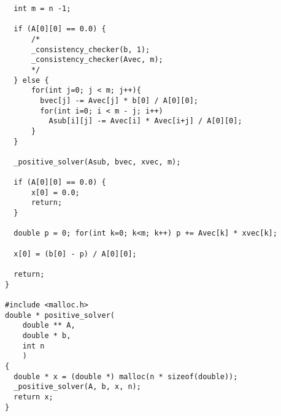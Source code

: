 \documentclass{article}
\begin{document}
\begin{verbatim}
  int m = n -1;

  if (A[0][0] == 0.0) {
      /*
      _consistency_checker(b, 1);
      _consistency_checker(Avec, m);
      */
  } else {
      for(int j=0; j < m; j++){
        bvec[j] -= Avec[j] * b[0] / A[0][0];
        for(int i=0; i < m - j; i++)
          Asub[i][j] -= Avec[i] * Avec[i+j] / A[0][0];
      }
  }

  _positive_solver(Asub, bvec, xvec, m);

  if (A[0][0] == 0.0) {
      x[0] = 0.0;
      return;
  }

  double p = 0; for(int k=0; k<m; k++) p += Avec[k] * xvec[k];

  x[0] = (b[0] - p) / A[0][0];

  return;
}

#include <malloc.h>
double * positive_solver(
    double ** A, 
    double * b, 
    int n
    ) 
{
  double * x = (double *) malloc(n * sizeof(double));
  _positive_solver(A, b, x, n);
  return x;
}

\end{verbatim}
\end{document}
